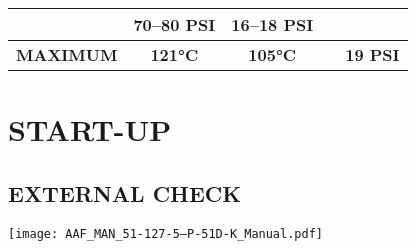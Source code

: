 \begin{table}[ht]
\begin{tabular} {ccccc|}
         & \multicolumn{1}{c|}{\textbf{70--80 PSI}}
         & \multicolumn{1}{c|}{\textbf{16--18 PSI}}
        \\
        \hline
        \multicolumn{1}{|c|}{\textbf{MAXIMUM}}
         & \multicolumn{1}{c|}{\textbf{121°C}}
         & \multicolumn{1}{c|}{\textbf{105°C}}
         & \multicolumn{1}{c|}{\textbf{}}
         & \multicolumn{1}{c|}{\textbf{19 PSI}}
        \\
        \hline
    \end{tabular}
\end{table}
\clearpage


\section{START-UP}
\subsection{EXTERNAL CHECK}
\begin{tablenumerate}
\end{tablenumerate}
\begin{center}
    \texttt{[image: AAF\_MAN\_51-127-5--P-51D-K\_Manual.pdf]}
\end{center}
\clearpage{}
